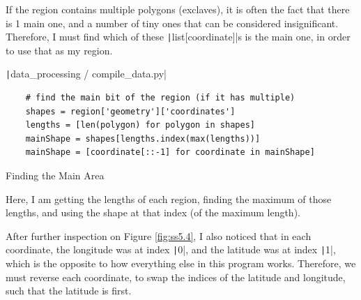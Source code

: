 \documentclass[12pt]{report}
\newcommand{\pil}[1]{\protect\texttt|#1|}
\begin{document}
If the region contains multiple polygons (exclaves), it is often the fact that there is 1 main one, and a number of tiny ones that can be considered insignificant. Therefore, I must find which of these \pil{list[coordinate]}s is the main one, in order to use that as my region.

\begin{listing}[H]
\pil{data_processing / compile_data.py}
\begin{verbatim}
    # find the main bit of the region (if it has multiple)
    shapes = region['geometry']['coordinates']
    lengths = [len(polygon) for polygon in shapes]
    mainShape = shapes[lengths.index(max(lengths))]
    mainShape = [coordinate[::-1] for coordinate in mainShape]
\end{verbatim}
\caption{Finding the Main Area}\label{cs:findMainArea}
\end{listing}

Here, I am getting the lengths of each region, finding the maximum of those lengths, and using the shape at that index (of the maximum length).

After further inspection on Figure \ref{fig:ss5.4}, I also noticed that in each coordinate, the longitude was at index \pil{0}, and the latitude was at index \pil{1}, which is the opposite to how everything else in this program works. Therefore, we must reverse each coordinate, to swap the indices of the latitude and longitude, such that the latitude is first.

\begin{center}
\end{center}
\end{document}
